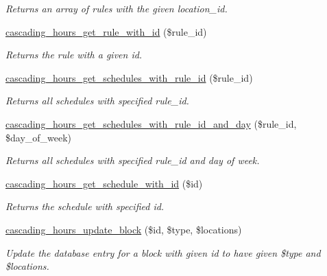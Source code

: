 \begin{DoxyCompactItemize}
\begin{DoxyCompactList}\small\item\em Returns an array of rules with the given location\+\_\+id. \end{DoxyCompactList}\item 
\hyperlink{cascading__hours_8module_a8ab971666a57902065b44bf8401d455e_a8ab971666a57902065b44bf8401d455e}{cascading\+\_\+hours\+\_\+get\+\_\+rule\+\_\+with\+\_\+id} (\$rule\+\_\+id)
\begin{DoxyCompactList}\small\item\em Returns the rule with a given id. \end{DoxyCompactList}\item 
\hyperlink{cascading__hours_8module_a58987021611b7d7573b813a20ca95ee4_a58987021611b7d7573b813a20ca95ee4}{cascading\+\_\+hours\+\_\+get\+\_\+schedules\+\_\+with\+\_\+rule\+\_\+id} (\$rule\+\_\+id)
\begin{DoxyCompactList}\small\item\em Returns all schedules with specified rule\+\_\+id. \end{DoxyCompactList}\item 
\hyperlink{cascading__hours_8module_a57a2e94943a8f166e6fd88d4c7c6c4c1_a57a2e94943a8f166e6fd88d4c7c6c4c1}{cascading\+\_\+hours\+\_\+get\+\_\+schedules\+\_\+with\+\_\+rule\+\_\+id\+\_\+and\+\_\+day} (\$rule\+\_\+id, \$day\+\_\+of\+\_\+week)
\begin{DoxyCompactList}\small\item\em Returns all schedules with specified rule\+\_\+id and day of week. \end{DoxyCompactList}\item 
\hyperlink{cascading__hours_8module_a4ed52ff4d0b7fbf6ae5d14d6d948aed5_a4ed52ff4d0b7fbf6ae5d14d6d948aed5}{cascading\+\_\+hours\+\_\+get\+\_\+schedule\+\_\+with\+\_\+id} (\$id)
\begin{DoxyCompactList}\small\item\em Returns the schedule with specified id. \end{DoxyCompactList}\item 
\hyperlink{cascading__hours_8module_a0f6b7d82ca5c3f3c748e01d781a72783_a0f6b7d82ca5c3f3c748e01d781a72783}{cascading\+\_\+hours\+\_\+update\+\_\+block} (\$id, \$type, \$locations)
\begin{DoxyCompactList}\small\item\em Update the database entry for a block with given id to have given \$type and \$locations. \end{DoxyCompactList}\item 

\end{DoxyCompactItemize}

